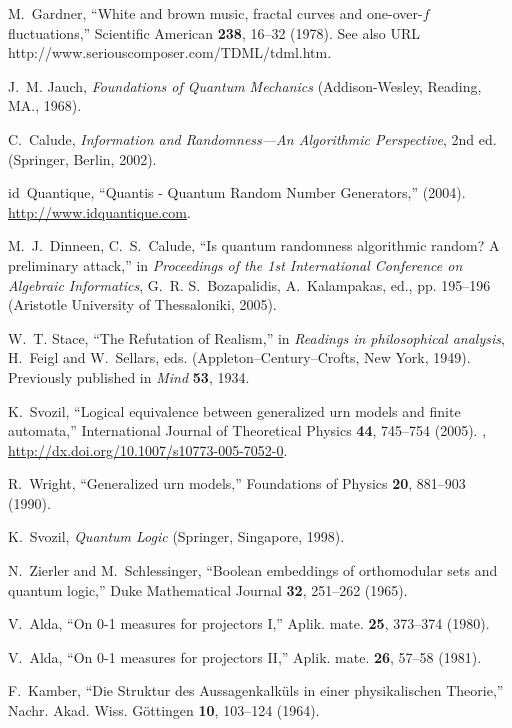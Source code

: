 \documentclass[pra,amsfonts,preprint,showkeys]{revtex4}
\begin{document}
\begin{thebibliography}{10}
M.~Gardner, \enquote{White and brown music, fractal curves and one-over-$f$
  fluctuations,} Scientific American \textbf{238}, 16--32 (1978). See also URL
  http://www.seriouscomposer.com/TDML/tdml.htm.

J.~M. Jauch, \emph{Foundations of Quantum Mechanics} (Addison-Wesley, Reading,
  MA., 1968).

C.~Calude, \emph{Information and Randomness---An Algorithmic Perspective}, 2nd
  ed. (Springer, Berlin, 2002).

id~Quantique, \enquote{Quantis - Quantum Random Number Generators,}  (2004).
  \urlprefix\url{http://www.idquantique.com}.

M.~J.~Dinneen, C.~S.~Calude, \enquote{Is quantum randomness algorithmic random? A
  preliminary attack,} in \emph{Proceedings of the 1st International Conference on
  Algebraic Informatics}, G.~R. S.~Bozapalidis, A.~Kalampakas, ed., pp.
  195--196 (Aristotle University of Thessaloniki, 2005).

W.~T. Stace, \enquote{The Refutation of Realism,} in \emph{Readings in
  philosophical analysis}, H.~Feigl and W.~Sellars, eds.
  (Appleton--Century--Crofts, New York, 1949). Previously published in {\em
  Mind} {\bf 53}, 1934.

K.~Svozil, \enquote{Logical equivalence between generalized urn models and
  finite automata,} International Journal of Theoretical Physics \textbf{44},
  745--754 (2005). ,
  \urlprefix\url{http://dx.doi.org/10.1007/s10773-005-7052-0}.

R.~Wright, \enquote{Generalized urn models,} Foundations of Physics
  \textbf{20}, 881--903 (1990).

K.~Svozil, \emph{Quantum Logic} (Springer, Singapore, 1998).

N.~Zierler and M.~Schlessinger, \enquote{Boolean embeddings of orthomodular
  sets and quantum logic,} Duke Mathematical Journal \textbf{32}, 251--262
  (1965).

V.~Alda, \enquote{On\/ {\rm 0-1} measures for projectors I,} Aplik. mate.
  \textbf{25}, 373--374 (1980).

V.~Alda, \enquote{On\/ {\rm 0-1} measures for projectors II,} Aplik. mate.
  \textbf{26}, 57--58 (1981).

F.~Kamber, \enquote{Die {S}truktur des {A}ussagenkalk{\"{u}}ls in einer
  physikalischen {T}heorie,} Nachr. Akad. Wiss. G{\"{o}}ttingen \textbf{10},
  103--124 (1964).


\end{thebibliography}
\end{document}
